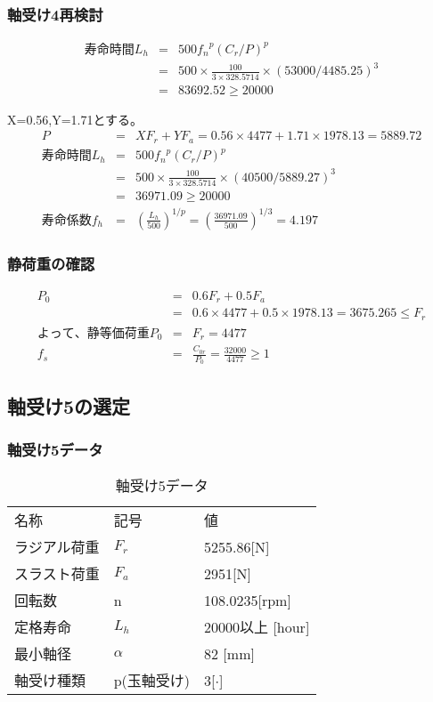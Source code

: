 \subsubsection{軸受け4再検討}
\begin{eqnarray}
寿命時間L_h &=& 500{f_n}^p(C_r/P)^p\\
           &=& 500 \times \frac{100}{3 \times 328.5714} \times (53000/4485.25)^3\\
           &=& 83692.52 \geq 20000
\end{eqnarray}

X=0.56,Y=1.71とする。
\begin{eqnarray}
P &=& XF_r+YF_a = 0.56 \times 4477 + 1.71 \times 1978.13 = 5889.72\\
寿命時間L_h &=& 500{f_n}^p(C_r/P)^p\\
           &=& 500 \times \frac{100}{3 \times 328.5714} \times (40500/5889.27)^3\\
           &=& 36971.09 \geq 20000\\
寿命係数f_h &=& \left( \frac{L_h}{500} \right)^{1/p} = \left( \frac{36971.09}{500} \right)^{1/3} = 4.197
\end{eqnarray}

\subsubsection{静荷重の確認}
\begin{eqnarray}
P_0&=&0.6F_r+0.5F_a\\
&=&0.6 \times 4477 + 0.5 \times 1978.13 = 3675.265 \leq F_r\\
よって、静等価荷重P_0 &=& F_r = 4477\\
f_s &=& \frac{C_{0r}}{P_0} = \frac{32000}{4477}\geq 1
\end{eqnarray}


\newpage
\subsection{軸受け5の選定}
\subsubsection{軸受け5データ}
\begin{table}[htb]
\begin{center}
  \caption{軸受け5データ}
  \begin{tabular}{lll} \hline
名称&記号&値\\
ラジアル荷重&$F_r$&5255.86[N]\\
スラスト荷重&$F_a$&2951[N]\\
回転数&n&108.0235[rpm]\\
定格寿命&$L_h$&20000以上 [hour]\\
最小軸径&$\alpha$&82 [mm]\\
軸受け種類&p(玉軸受け)&3[$\cdot$]\\
\hline
  \end{tabular}
\end{center}
\end{table}

